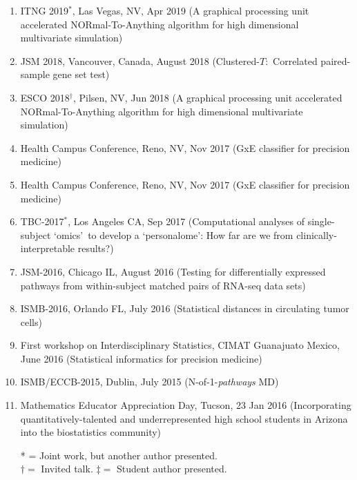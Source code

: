 \documentclass[paper=a4,fontsize=11pt]{scrartcl} %
\newcommand{\TalkEntry}[4]{
		\noindent #1, #2, #3 #4}
\begin{document}
\begin{enumerate}
    \item \TalkEntry{ITNG 2019$^{*}$}{Las Vegas, NV}{Apr 2019}{(A graphical processing unit accelerated NORmal-To-Anything algorithm for high dimensional multivariate simulation)}
  
\item\TalkEntry{JSM 2018}{Vancouver, Canada}{August 2018}{(Clustered-$T$:~Correlated paired-sample gene set test)}

      \item \TalkEntry{ESCO 2018$^{\dagger}$}{Pilsen, NV}{Jun 2018}{(A graphical processing unit accelerated NORmal-To-Anything algorithm for high dimensional multivariate simulation)}

\item\TalkEntry{Health Campus Conference}{Reno, NV}{Nov 2017}{(GxE classifier for precision medicine)}
  
\item\TalkEntry{Health Campus Conference}{Reno, NV}{Nov 2017}{(GxE classifier for precision medicine)}
  
  \item\TalkEntry{TBC-2017$^{*}$}{Los Angeles CA}{Sep 2017}{(Computational analyses of single-subject \lq omics\rq~to develop a \lq personalome\rq: How far are we from clinically-interpretable results?)}

\item\TalkEntry{JSM-2016}{Chicago IL}{August 2016}{(Testing for differentially expressed pathways from within-subject matched pairs of RNA-seq data sets)}
\item\TalkEntry{ISMB-2016}{Orlando FL}{July 2016}{(Statistical distances in circulating tumor cells)}
\item\TalkEntry{First workshop on Interdisciplinary Statistics}{CIMAT Guanajuato Mexico}{June 2016}{(Statistical informatics for precision medicine)} 
\item\TalkEntry{ISMB/ECCB-2015}{Dublin}{July 2015}{(N-of-1-\textit{pathways} MD)} 
\item\TalkEntry{2016 Mathematics Educator Appreciation Day}{Tucson}{23 Jan 2016}{(Incorporating quantitatively-talented and underrepresented high school students in Arizona into the biostatistics community)} 
\vspace{-7pt}

* = Joint work, but another author presented.\\
$\dagger=$ Invited talk.
$\ddag=$ Student author presented.

\end{enumerate}
\end{document}

